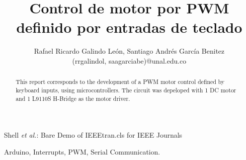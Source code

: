 \documentclass[journal]{IEEEtran}
\begin{document}
\title{Control de motor por PWM definido por entradas de teclado}
\author{Rafael Ricardo Galindo León, Santiago Andrés García Benitez\\
        (rrgalindol, saagarciabe)@unal.edu.co}

{Shell \MakeLowercase{\textit{et al.}}: Bare Demo of IEEEtran.cls for IEEE Journals}

\maketitle
\begin{otherlanguage}{english} 
\begin{abstract}
This report corresponds to the development of a PWM motor control defined by keyboard inputs, using microcontrollers. The circuit was depeloped with 1 DC motor and 1 L9110S H-Bridge as the motor driver.
\end{abstract}
\begin{IEEEkeywords}
Arduino, Interrupts, PWM, Serial Communication.
\end{IEEEkeywords}
\end{otherlanguage}
\IEEEpeerreviewmaketitle
\end{document}
